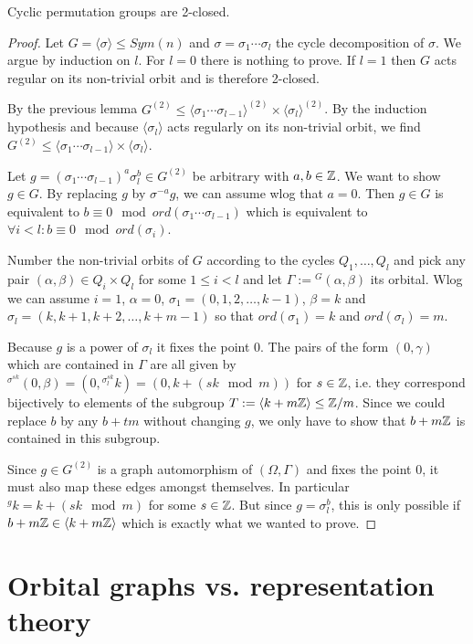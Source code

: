 \documentclass[fontsize=11pt,fleqn,a4paper]{scrartcl}
\begin{document}
\begin{theorem}
Cyclic permutation groups are 2-closed.
\end{theorem}
\begin{proof}
Let $G=\langle \sigma \rangle \leq Sym(n)$ and $\sigma = \sigma_1 \cdots \sigma_l$ the cycle decomposition of $\sigma$. We argue by induction on $l$. For $l=0$ there is nothing to prove. If $l=1$ then $G$ acts regular on its non-trivial orbit and is therefore 2-closed.

By the previous lemma $G^{(2)} \leq \langle\sigma_1\cdots\sigma_{l-1}\rangle^{(2)} \times \langle\sigma_l\rangle^{(2)}$. By the induction hypothesis and because $\langle\sigma_l\rangle$ acts regularly on its non-trivial orbit, we find $G^{(2)}\leq \langle\sigma_1\cdots\sigma_{l-1}\rangle \times \langle\sigma_l\rangle$.

Let $g = (\sigma_1\cdots\sigma_{l-1})^a \sigma_l^b \in G^{(2)}$ be arbitrary with $a,b\in\mathbb{Z}$. We want to show $g\in G$. By replacing $g$ by $\sigma^{-a} g$, we can assume wlog that $a=0$. Then $g \in G$ is equivalent to $b\equiv 0 \mod ord(\sigma_1\cdots\sigma_{l-1})$ which is equivalent to $\forall i<l: b\equiv 0 \mod ord(\sigma_i)$.

Number the non-trivial orbits of $G$ according to the cycles $Q_1,\ldots,Q_l$ and pick any pair $(\alpha,\beta)\in Q_i\times Q_l$ for some $1\leq i<l$ and let $\Gamma := {^G(\alpha,\beta)}$ its orbital. Wlog we can assume $i=1$, $\alpha=0$, $\sigma_1=(0,1,2,\ldots,k-1)$, $\beta=k$ and $\sigma_l=(k,k+1,k+2,\ldots,k+m-1)$ so that $ord(\sigma_1)=k$ and $ord(\sigma_l)=m$.

Because $g$ is a power of $\sigma_l$ it fixes the point $0$. The pairs of the form $(0,\gamma)$ which are contained in $\Gamma$ are all given by ${^{\sigma^{sk}}(0,\beta)} = (0,{^{\sigma_l^{sk}}k}) = (0,k+(sk \mod m))$ for $s\in\mathbb{Z}$, i.e. they correspond bijectively to elements of the subgroup $T:=\langle k+m\mathbb{Z}\rangle \leq \mathbb{Z}/m$. Since we could replace $b$ by any $b+tm$ without changing $g$, we only have to show that $b+m\mathbb{Z}$ is contained in this subgroup.

Since $g\in G^{(2)}$ is a graph automorphism of $(\Omega,\Gamma)$ and fixes the point $0$, it must also map these edges amongst themselves. In particular ${^g k}=k+(sk\mod m)$ for some $s\in\mathbb{Z}$. But since $g=\sigma_l^b$, this is only possible if $b+m\mathbb{Z}\in\langle k+m\mathbb{Z}\rangle$ which is exactly what we wanted to prove.
\end{proof}

\section{Orbital graphs vs. representation theory}
\end{document}

